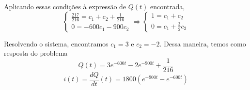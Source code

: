 \documentclass[oneside,12pt,a4paper]{report}
\begin{document}
\begin{resolucao}
    Aplicando essas condições à expressão de $Q(t)$ encontrada,
    \[\begin{cases}
        \displaystyle\frac{217}{216}=c_1+c_2+\frac{1}{216}\\
        \displaystyle0=-600c_1-900c_2
    \end{cases}\Rightarrow
    \begin{cases}
        \displaystyle1=c_1+c_2\\
        \displaystyle0=c_1+\frac{3}{2}c_2
    \end{cases}\]

    Resolvendo o sistema, encontramos $c_1=3$ e $c_2=-2$. Dessa maneira, temos como resposta do problema
    \[\boxed{Q(t)=3e^{-600t}-2e^{-900t}+\frac{1}{216}}\]
    \[\boxed{i(t)=\frac{dQ}{dt}(t)=1800\left(e^{-900t}-e^{-600t}\right)}\]
\end{resolucao}
\end{document}
